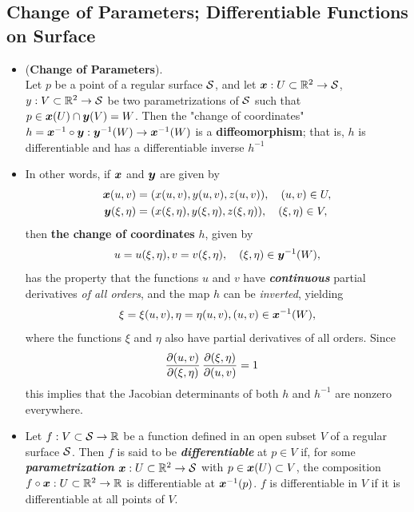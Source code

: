 \documentclass[11pt]{article}
\begin{document}
\subsection{Change of Parameters; Differentiable Functions on Surface}
\begin{itemize}
\item 
\begin{proposition} (\textbf{Change of Parameters}). \\
Let $p$ be a point of a regular surface ${\mathcal S}$, and let $\boldsymbol{x}: U \subset {\mathbb R}^2 \rightarrow {\mathcal S}$, $\boldsymbol{}y: V \subset {\mathbb R}^2 \rightarrow {\mathcal S}$ be two parametrizations of ${\mathcal S}$ such that $p \in \boldsymbol{x}(U) \cap \boldsymbol{y}(V) = W$. Then the "change of coordinates" $h = \boldsymbol{x}^{-1} \circ \boldsymbol{y}: \boldsymbol{y}^{-1}(W) \rightarrow \boldsymbol{x}^{-1}(W)$ is a \textbf{diffeomorphism}; that is, $h$ is differentiable and has a differentiable inverse $h^{-1}$
\end{proposition}

\item 
In other words, if $\boldsymbol{x}$ and $\boldsymbol{y}$ are given by
\begin{align*}
\boldsymbol{x}(u, v) &= (x(u, v), y(u, v), z(u, v)), \quad (u, v) \in U,\\
\boldsymbol{y}(\xi,\eta) &= (x(\xi,\eta), y(\xi,\eta), z(\xi,\eta)),\quad (\xi,\eta) \in V,
\end{align*} then \textbf{the change of coordinates} $h$, given by
\begin{align*}
u = u(\xi,\eta), v = v(\xi,\eta), \quad (\xi,\eta) \in \boldsymbol{y}^{-1}(W),
\end{align*} has the property that the functions $u$ and $v$ have \emph{\textbf{continuous}} partial derivatives \emph{of all orders}, and the map $h$ can be \emph{inverted}, yielding
\begin{align*}
\xi = \xi(u,v), \eta = \eta(u,v), (u,v) \in \boldsymbol{x}^{-1}(W),
\end{align*} where the functions $\xi$ and $\eta$ also have partial derivatives of all orders. Since
\begin{align*}
\frac{\partial (u, v)}{ \partial (\xi, \eta)}\,\frac{\partial (\xi, \eta)}{ \partial (u, v)} &= 1
\end{align*} this implies that the Jacobian determinants of both $h$ and $h^{-1}$ are nonzero everywhere.

\item \begin{definition}
Let $f: V \subset {\mathcal S} \rightarrow {\mathbb R}$ be a function defined in an open subset $V$ of a regular surface ${\mathcal S}$. Then $f$ is said to be \emph{\textbf{differentiable}} at $p \in V$ if, for some \emph{\textbf{parametrization}} $\boldsymbol{x}: U \subset {\mathbb R}^2 \rightarrow {\mathcal S}$ with $p \in \boldsymbol{x}(U) \subset V$, the composition $f \circ \boldsymbol{x}: U \subset {\mathbb R}^2 \rightarrow {\mathbb R}$ is differentiable at $\boldsymbol{x}^{-1}(p)$. $f$ is differentiable in $V$ if it is differentiable at all points of $V$.
\end{definition}


\end{itemize}
\end{document}
